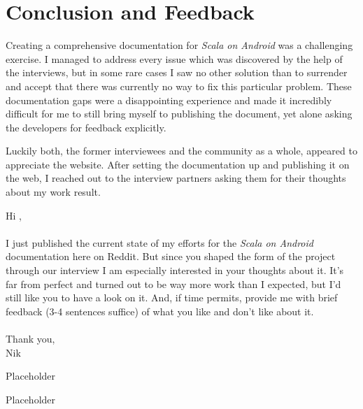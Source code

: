 \section{Conclusion and Feedback}

Creating a comprehensive documentation for \textit{Scala on Android} was a challenging exercise. I managed to address every issue which was discovered by the help of the interviews, but in some rare cases I saw no other solution than to surrender and accept that there was currently no way to fix this particular problem. These documentation gaps were a disappointing experience and made it incredibly difficult for me to still bring myself to publishing the document, yet alone asking the developers for feedback explicitly.

Luckily both, the former interviewees and the community as a whole, appeared to appreciate the website. After setting the documentation up and publishing it on the web, I reached out to the interview partners asking them for their thoughts about my work result.

\begin{displayquote}

	Hi \underline{\hspace{2cm}},\\\\

	I just published the current state of my efforts for the \textit{Scala on Android} documentation here on Reddit. But since you shaped the form of the project through our interview I am especially interested in your thoughts about it.
	It's far from perfect and turned out to be way more work than I expected, but I'd still like you to have a look on it. And, if time permits, provide me with brief feedback (3-4 sentences suffice) of what you like and don't like about it.\\\\
	Thank you,\\
	Nik

\end{displayquote}

\hrulefill

\begin{displayquote}

	Placeholder

\end{displayquote}

\hrulefill

\begin{displayquote}

	Placeholder

\end{displayquote}

